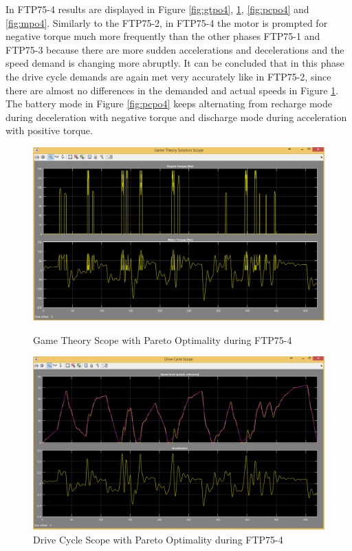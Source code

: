 In FTP75-4 results are displayed in Figure \ref{fig:gtpo4}, \ref{fig:dcpo4}, \ref{fig:pcpo4} and \ref{fig:mpo4}. Similarly to the FTP75-2, in FTP75-4 the motor is prompted for negative torque much more frequently than the other phases FTP75-1 and FTP75-3 because there are more sudden accelerations and decelerations and the speed demand is changing more abruptly. It can be concluded that in this phase the drive cycle demands are again met very accurately like in FTP75-2, since there are almost no differences in the demanded and actual speeds in Figure \ref{fig:dcpo4}. The battery mode in Figure \ref{fig:pcpo4} keeps alternating from recharge mode during deceleration with negative torque and discharge mode during acceleration with positive torque.

\begin{figure}[hp]
\centering
\includegraphics[scale=0.45]{figures/Pareto/FTP75-4/gameTheory05Juli}
\caption{Game Theory Scope with Pareto Optimality during FTP75-4}
\label{fig:gtpo4}
\includegraphics[scale=0.41]{figures/Pareto/FTP75-4/driveCycle05Juli}
\caption{Drive Cycle Scope with Pareto Optimality during FTP75-4}
\label{fig:dcpo4}
\end{figure}

